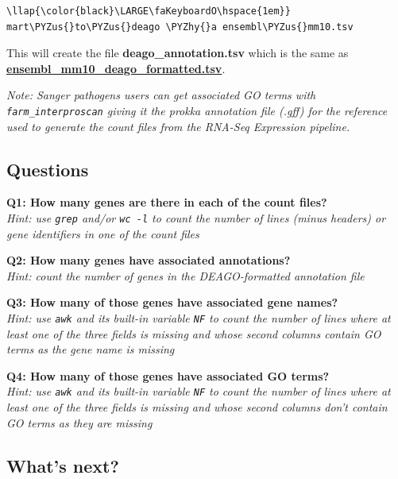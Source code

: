 \documentclass[11pt]{article}
\def\PYZus{\char`\_}
\def\PYZhy{\char`\-}
\begin{document}
\begin{terminalinput}
\begin{Verbatim}[commandchars=\\\{\}]
\llap{\color{black}\LARGE\faKeyboardO\hspace{1em}} mart\PYZus{}to\PYZus{}deago \PYZhy{}a ensembl\PYZus{}mm10.tsv
\end{Verbatim}
\end{terminalinput}

    This will create the file \textbf{deago\_annotation.tsv} which is the
same as
\href{data/ensembl_mm10_deago_formatted.tsv}{\textbf{ensembl\_mm10\_deago\_formatted.tsv}}.

\textit{Note: Sanger pathogens users can get associated GO terms with
\texttt{farm\_interproscan} giving it the prokka annotation file (.gff)
for the reference used to generate the count files from the RNA-Seq
Expression pipeline.}

    \hypertarget{questions}{%
\subsection{Questions}\label{questions}}

\textbf{Q1: How many genes are there in each of the count files?}\\
\textit{Hint: use \texttt{grep} and/or \texttt{wc\ -l} to count the number
of lines (minus headers) or gene identifiers in one of the count files}

\textbf{Q2: How many genes have associated annotations?}\\
\textit{Hint: count the number of genes in the DEAGO-formatted annotation
file}

\textbf{Q3: How many of those genes have associated gene names?}\\
\textit{Hint: use \texttt{awk} and its built-in variable \texttt{NF} to
count the number of lines where at least one of the three fields is
missing and whose second columns contain GO terms as the gene name is
missing}

\textbf{Q4: How many of those genes have associated GO terms?}\\
\textit{Hint: use \texttt{awk} and its built-in variable \texttt{NF} to
count the number of lines where at least one of the three fields is
missing and whose second columns don't contain GO terms as they are
missing}

    \hypertarget{whats-next}{%
\subsection{What's next?}\label{whats-next}}
\end{document}

